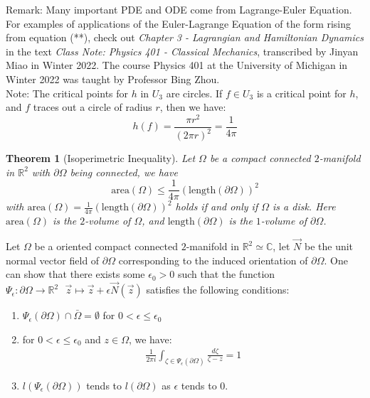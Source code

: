 \documentclass[11pt,oneside]{book}
\theoremstyle{break}
\theoremstyle{break}
\newtheorem{thm}{Theorem}[section]
\newcommand{\R}{\mathbb{R}}
\newcommand{\Complex}{\mathbb{C}}
\newcommand{\note}{\color{red}Note: \color{black}}
\newcommand{\remark}{\color{blue}Remark: \color{black}}
\begin{document}
\remark Many important PDE and ODE come from Lagrange-Euler Equation. For examples of applications of the Euler-Lagrange Equation of the form rising from equation (**), check out \textit{Chapter 3 - Lagrangian and Hamiltonian Dynamics} in the text \textit{Class Note: Physics 401 - Classical Mechanics}, transcribed by Jinyan Miao in Winter 2022. The course Physics 401 at the University of Michigan in Winter 2022 was taught by Professor Bing Zhou.\\

\note The critical points for $h$ in $U_3$ are circles. If $f\in U_3$ is a critical point for $h$, and $f$ traces out a circle of radius $r$, then we have: 
$$h(f) = \frac{\pi r^2}{(2\pi r)^2} = \frac{1}{4\pi}$$

\begin{thm}[Isoperimetric Inequality]
Let $\Omega$ be a compact connected $2$-manifold in $\R^2$ with $\partial \Omega$ being connected, we have $$\text{area}(\Omega) \leq \frac{1}{4\pi}\left( \text{length}(\partial \Omega)\right)^2$$ with $\text{area}(\Omega) = \frac{1}{4\pi}\left( \text{length}(\partial \Omega)\right)^2$ holds if and only if $\Omega$ is a disk. Here $\text{area}(\Omega)$ is the $2$-volume of $\Omega$, and $\text{length}(\partial \Omega)$ is the $1$-volume of $\partial\Omega$.
\end{thm}

Let $\Omega$ be a oriented compact connected $2$-manifold in $\R^2 \simeq \Complex$, let $\vec{N}$ be the unit normal vector field of $\partial \Omega$ corresponding to the induced orientation of $\partial \Omega$. One can show that there exists some $\epsilon_0>0$ such that the function $\Psi_\epsilon :\partial \Omega \to \R^2 \ \ \ \vec{z} \mapsto \vec{z} + \epsilon \vec{N}(\vec{z})$ satisfies the following conditions:
\begin{enumerate}[topsep=3pt,itemsep=-1ex,partopsep=1ex,parsep=1ex]
\item $\Psi_{\epsilon} (\partial \Omega) \cap \bar{\Omega} = \emptyset $ for $0<\epsilon\leq \epsilon_0$
\item for $0 < \epsilon \leq \epsilon_0$ and $z \in \Omega$, we have:
\begin{align*}
\frac{1}{2\pi i}\int_{\zeta \in \Psi_{\epsilon}(\partial \Omega)} \frac{d\zeta}{\zeta - z} = 1
\end{align*}
\item $l(\Psi_{\epsilon}(\partial \Omega))$ tends to $l(\partial \Omega)$ as $\epsilon $ tends to $0$. 
\end{enumerate} 
\end{document}
